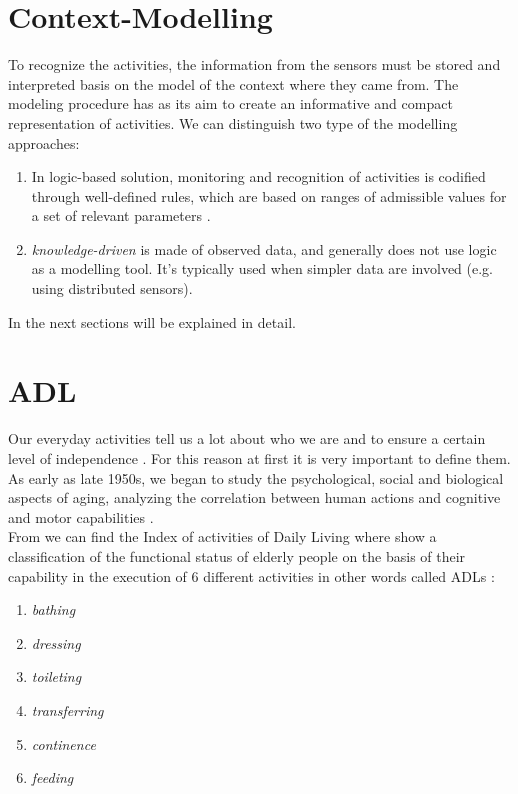 \documentclass{thesisreport}
\begin{document}
\section{Context-Modelling}
To recognize the activities, the information from the sensors must be stored and interpreted basis on the model of the context where they came from.  
The modeling procedure has as its aim to create an informative and compact representation of activities. 
We can distinguish two type of the modelling approaches: 
\begin{enumerate}
    \item In logic-based solution, monitoring and recognition of activities is codified through well-defined rules, which are based on ranges of admissible values for a set of relevant parameters \cite{phdthesis}.
    \item \textit{knowledge-driven} is made of observed data, and generally does not use logic as a modelling tool. It's typically used when simpler data are involved (e.g. using distributed sensors)\cite{kareem2018arianna}. 
\end{enumerate}
In the next sections will be explained in detail. 

\section{ADL}
Our everyday activities tell us a lot about who we are and to ensure a certain level of independence \cite{buoncompagni2017towards}. For this reason at first it is very important to define them. 
\\
As early as late 1950s, we began to study the psychological, social and biological aspects of aging, analyzing the correlation between human actions and cognitive and motor capabilities \cite{buoncompagni2017towards}. 
\\

From \cite{Multidisciplinary} we can find the Index of activities of Daily Living where show a classification of the functional status of elderly people on the basis of their capability in the execution of 6 different activities in other words called ADLs \cite{buoncompagni2017towards}:
\begin{enumerate}[noitemsep,topsep=1pt,parsep=1pt,partopsep=1pt]
    \item \textit{bathing}
    \item \textit{dressing}
    \item \textit{toileting}
    \item \textit{transferring}
    \item \textit{continence}
    \item \textit{feeding}
\end{enumerate}
\end{document}
